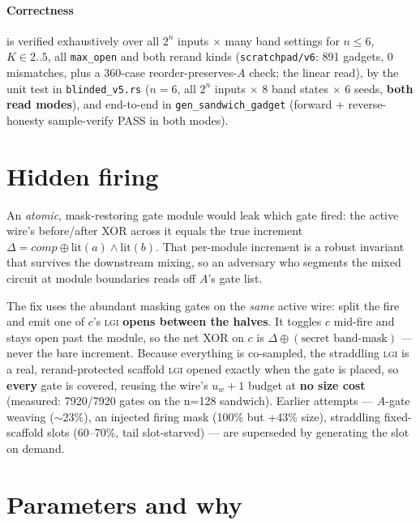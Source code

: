 \documentclass[11pt]{article}
\newcommand{\doc}[1]{\texttt{#1}}
\newcommand{\xor}{\oplus}
\newcommand{\lgi}{\textsc{lgi}}
\begin{document}
\paragraph{Correctness} is verified exhaustively over all $2^n$ inputs $\times$
many band settings for $n \le 6$, $K \in 2..5$, all \doc{max\_open} and both
rerand kinds (\doc{scratchpad/v6}: 891 gadgets, 0 mismatches, plus a 360-case
reorder-preserves-$A$ check; the linear read), by the unit test in
\doc{blinded\_v5.rs} ($n=6$, all $2^n$ inputs $\times$ 8 band states $\times$ 6
seeds, \textbf{both read modes}), and end-to-end in \doc{gen\_sandwich\_gadget}
(forward + reverse-honesty sample-verify PASS in both modes).

\section{Hidden firing}

An \emph{atomic}, mask-restoring gate module would leak which gate fired: the
active wire's before/after XOR across it equals the true increment $\Delta =
\mathit{comp} \xor \mathrm{lit}(a)\land\mathrm{lit}(b)$. That per-module increment
is a robust invariant that survives the downstream mixing, so an adversary who
segments the mixed circuit at module boundaries reads off $A$'s gate list.

The fix uses the abundant masking gates on the \emph{same} active wire: split the
fire and emit one of $c$'s \lgi{} \textbf{opens between the halves}. It toggles
$c$ mid-fire and stays open past the module, so the net XOR on $c$ is $\Delta \xor
(\text{secret band-mask})$ --- never the bare increment. Because everything is
co-sampled, the straddling \lgi{} is a real, rerand-protected scaffold \lgi{}
opened exactly when the gate is placed, so \textbf{every} gate is covered, reusing
the wire's $u_w+1$ budget at \textbf{no size cost} (measured: 7920/7920 gates on
the n=128 sandwich). Earlier attempts --- $A$-gate weaving ($\sim$23\%), an
injected firing mask (100\% but +43\% size), straddling fixed-scaffold slots
(60--70\%, tail slot-starved) --- are superseded by generating the slot on demand.

\section{Parameters and why}
\end{document}
